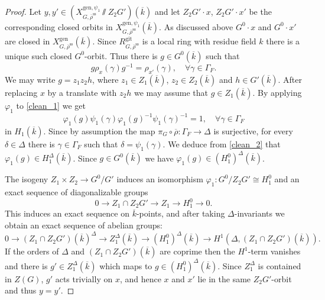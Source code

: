 \documentclass{amsart}
\theoremstyle{definition}
\theoremstyle{remark}
\newcommand{\rhobar}{\overline{\rho}}
\newcommand{\gen}{\mathrm{gen}}
\newcommand{\gps}{\mathrm{git}}
\newcommand{\kbar}{\overline{k}}
\newcommand{\rhobarss}{\rhobar^{\mathrm{ss}}}
\begin{document}
\begin{proof}
Let $y, y'\in (X^{\gen, \psi_1}_{G, \rhobarss}\sslash Z_2G')(\kbar)$ and let 
$Z_2G'\cdot x$, $Z_2G'\cdot x'$ be the corresponding closed orbits in $X^{\gen, \psi_1}_{G, \rhobarss}(\kbar)$.
As discussed above $G^0\cdot x$ and $G^0\cdot x'$ are closed in $X^{\gen}_{G, \rhobarss}(\kbar)$. 
Since $R^{\gps}_{G, \rhobarss}$ is a local ring with residue field $k$ there is a unique such closed $G^0$-orbit. Thus there is $g\in G^0(\kbar)$ such that 
\begin{equation}\label{clean_1}
 g \rho_x(\gamma) g^{-1} = \rho_{x'}(\gamma), \quad  \forall \gamma\in \Gamma_F.
\end{equation}
We may write 
$g = z_1 z_2 h$, where $z_1\in Z_1(\kbar)$, $z_2\in Z_2(\kbar)$ and $h\in G'(\kbar)$. After replacing $x$ by a translate with 
$z_2h$ we may assume that $g\in Z_1(\kbar)$. By applying $\varphi_1$ to \eqref{clean_1} we get 
\begin{equation}\label{clean_2}
 \varphi_1(g) \psi_1(\gamma) \varphi_1(g)^{-1} \psi_1(\gamma)^{-1} = 1, \quad \forall \gamma\in \Gamma_F
\end{equation} 
in $H_1(\kbar)$. Since by assumption the map $\pi_G \circ \rhobar: \Gamma_F \rightarrow \Delta$
is surjective, for every $\delta\in \Delta$ there is $\gamma \in \Gamma_F$ such that $\delta=\psi_1(\gamma)$.  
We deduce from \eqref{clean_2} that $\varphi_1(g)\in H_1^{\Delta}(\kbar)$. Since $g\in G^0(\kbar)$ we have $\varphi_1(g) \in (H_1^0)^{\Delta}(\kbar)$.

The isogeny $Z_1\times Z_2\rightarrow G^0/G'$ induces an isomorphism $\varphi_1: G^0/Z_2 G'\cong H_1^0$ and an exact sequence of diagonalizable 
groups  
$$0\rightarrow Z_1\cap Z_2G'\rightarrow Z_1\rightarrow H_1^0\rightarrow 0.$$
This induces an exact sequence on $\kbar$-points, and after taking $\Delta$-invariants
we obtain an exact sequence of abelian groups: 
$$0\rightarrow (Z_1\cap Z_2G')(\kbar)^{\Delta} \rightarrow Z_1^{\Delta}(\kbar)\rightarrow (H_1^0)^{\Delta}(\kbar)\rightarrow H^1(\Delta, (Z_1\cap Z_2G')(\kbar)).$$
If the orders of $\Delta$ and $(Z_1\cap Z_2G')(\kbar)$ are coprime then the $H^1$-term vanishes and 
there is $g'\in Z_1^{\Delta}(\kbar)$ which maps to $g\in (H_1^0)^{\Delta}(\kbar)$. 
Since $Z_1^{\Delta}$ is contained in $Z(G)$, $g'$ acts trivially on $x$, and hence $x$ and $x'$ lie
in the same $Z_2G'$-orbit and thus $y=y'$.
\end{proof} 
\end{document}
